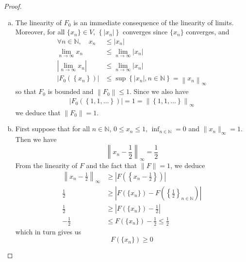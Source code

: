 \documentclass[11pt,a4paper,twoside]{article}
\theoremstyle{definition}
\theoremstyle{plain}
\begin{document}
\begin{proof}\hfill

  \begin{enumerate}[(a)]

  \item The linearity of $F_0$ is an immediate consequence of the linearity of limits. Moreover, for all $\{ x_n \} \in V$,
    $\left\{ \left| x_n \right| \right\}$ converges since $\{ x_n \}$ converges, and
    \begin{align*}
      \forall n \in \mathbb{N}, \quad x_n &\leq \left| x_n \right| \\
      \lim_{n \to \infty} x_n &\leq \lim_{n \to \infty} \left| x_n \right| \\
      \left| \lim_{n \to \infty} x_n \right| &\leq \lim_{n \to \infty} \left| x_n \right| \\
      \left| F_0 \left( \left\{ x_n \right\} \right) \right| &\leq \sup \left\{ \left| x_n \right|, n \in \mathbb{N} \right\} = \left\| x_n \right\|_\infty
    \end{align*}
    so that $F_0$ is bounded and $\left\| F_0 \right\| \leq 1$. Since we also have
    \begin{align*}
      \left| F_0 \left( \left\{ 1, 1, \dotsc \right\} \right) \right| = 1 = \left\| \left\{ 1, 1, \dotsc \right\} \right\|_\infty
    \end{align*}
    we deduce that $\left\| F_0 \right\| = 1$.

  \item First suppose that for all $n \in \mathbb{N}$, $0 \leq x_n \leq 1$, $\inf_{n \in \mathbb{N}} = 0$
    and $\| x_n \|_\infty = 1$. Then we have
    \begin{equation*}
      \left\| x_n - \frac{1}{2} \right\|_\infty = \frac{1}{2}
    \end{equation*}
    From the linearity of $F$ and the fact that $\| F \| = 1$, we deduce
    \begin{align*}
      \left\| x_n - \frac{1}{2} \right\|_\infty &\geq \left| F \left( \left\{ x_n - \frac{1}{2} \right\} \right) \right| \\
      \frac{1}{2} &\geq \left| F \left( \{ x_n \} \right) - F \left( \left\{ \frac{1}{2} \right\}_{n \in \mathbb{N}} \right) \right| \\
      \frac{1}{2} &\geq \left| F \left( \{ x_n \} \right) - \frac{1}{2} \right| \\
      - \frac{1}{2} &\leq F \left( \{ x_n \} \right) - \frac{1}{2} \leq \frac{1}{2}
    \end{align*}
    which in turn gives us
    \begin{equation}\label{ineq:F_nonnegative}
      F \left( \{ x_n \} \right) \geq 0
    \end{equation}


\end{enumerate}
\end{proof}
\end{document}

